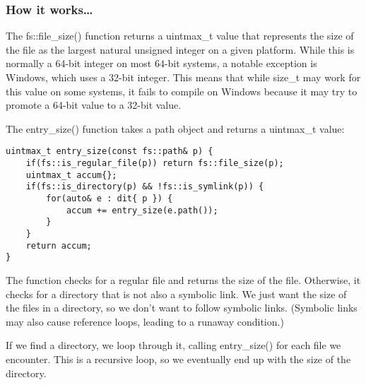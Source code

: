 \subsubsection{How it works…}

The fs::file\_size() function returns a uintmax\_t value that represents the size of the file as the largest natural unsigned integer on a given platform. While this is normally a 64-bit integer on most 64-bit systems, a notable exception is Windows, which uses a 32-bit integer. This means that while size\_t may work for this value on some systems, it fails to compile on Windows because it may try to promote a 64-bit value to a 32-bit value.

The entry\_size() function takes a path object and returns a uintmax\_t value:

\begin{lstlisting}[style=styleCXX]
uintmax_t entry_size(const fs::path& p) {
	if(fs::is_regular_file(p)) return fs::file_size(p);
	uintmax_t accum{};
	if(fs::is_directory(p) && !fs::is_symlink(p)) {
		for(auto& e : dit{ p }) {
			accum += entry_size(e.path());
		}
	}
	return accum;
}
\end{lstlisting}

The function checks for a regular file and returns the size of the file. Otherwise, it checks for a directory that is not also a symbolic link. We just want the size of the files in a directory, so we don't want to follow symbolic links. (Symbolic links may also cause reference loops, leading to a runaway condition.) 

If we find a directory, we loop through it, calling entry\_size() for each file we encounter. This is a recursive loop, so we eventually end up with the size of the directory.


























